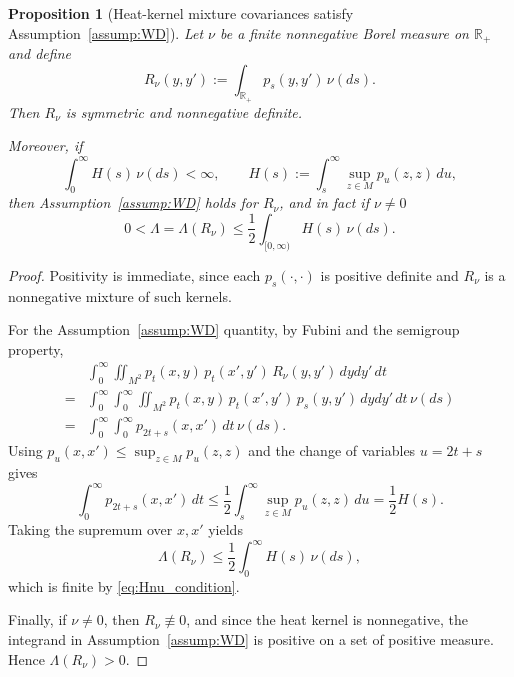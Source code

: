 \documentclass[10pt,a4paper]{amsart}
\newtheorem{proposition}{Proposition}
\def\RR{\mathbb{R}} %
\begin{document}
\begin{proposition}[Heat-kernel mixture covariances satisfy Assumption~\ref{assump:WD}]\label{prop:Lambda_heat_kernel_mixture}
Let $\nu$ be a finite nonnegative Borel measure on $\RR_+$ and define
\[
R_\nu(y,y') := \int_{\RR_+} p_s(y,y')\,\nu(ds).
\]
Then $R_\nu$ is symmetric and nonnegative definite.

Moreover, if
\begin{equation}\label{eq:Hnu_condition}
\int_0^\infty H(s)\,\nu(ds) < \infty,
\qquad
H(s):=\int_s^\infty \sup_{z\in M} p_u(z,z)\,du,
\end{equation}
then Assumption~\ref{assump:WD} holds for $R_\nu$, and in fact if $\nu\neq 0$
\[
0<\Lambda=\Lambda(R_\nu)\le \frac12 \int_{[0,\infty)} H(s)\,\nu(ds).
\]
\end{proposition}

\begin{proof}
Positivity is immediate, since each $p_s(\cdot,\cdot)$ is positive definite and $R_\nu$ is a nonnegative mixture of such kernels.

For the Assumption~\ref{assump:WD} quantity, by Fubini and the semigroup property,
\begin{align*}
&\int_0^\infty \iint_{M^2} p_t(x,y)\,p_t(x',y')\,R_\nu(y,y')\,dydy'\,dt \\
=&
\int_0^\infty \int_0^\infty \iint_{M^2} p_t(x,y)\,p_t(x',y')\,p_s(y,y')\,dydy'\,dt\,\nu(ds) \\
=&
\int_0^\infty \int_0^\infty p_{2t+s}(x,x')\,dt\,\nu(ds).
\end{align*}
Using $p_u(x,x')\le \sup_{z\in M}p_u(z,z)$ and the change of variables $u=2t+s$ gives
\[
\int_0^\infty p_{2t+s}(x,x')\,dt
\le
\frac12\int_s^\infty \sup_{z\in M} p_u(z,z)\,du
=
\frac12 H(s).
\]
Taking the supremum over $x,x'$ yields
\[
\Lambda(R_\nu)\le \frac12\int_0^\infty H(s)\,\nu(ds),
\]
which is finite by \eqref{eq:Hnu_condition}.

Finally, if $\nu\neq 0$, then $R_\nu\not\equiv 0$, and since the heat kernel is nonnegative, the integrand in Assumption~\ref{assump:WD} is positive on a set of positive measure. Hence $\Lambda(R_\nu)>0$.
\end{proof}
\end{document}
